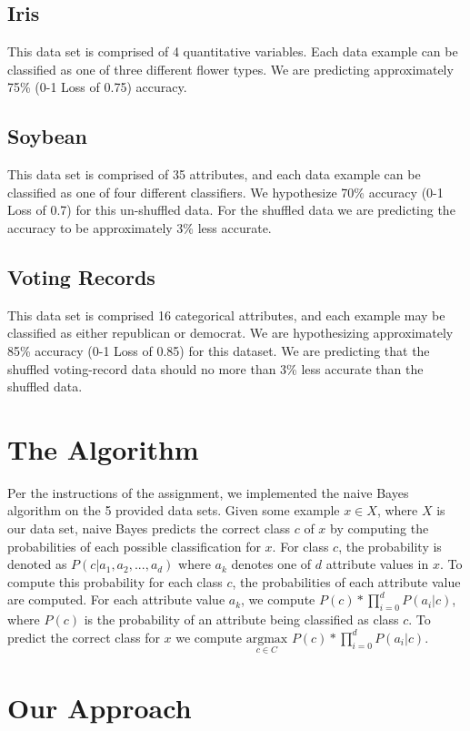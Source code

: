 \documentclass[twoside,11pt]{article}
\begin{document}
\subsection{Iris} This data set is comprised of 4 quantitative variables. Each data example can be classified as one of three different flower types. We are predicting approximately 75\% (0-1 Loss of 0.75) accuracy.
\subsection{Soybean} This data set is comprised of 35 attributes, and each data example can be classified as one of four different classifiers. We hypothesize 70\% accuracy (0-1 Loss of 0.7) for this un-shuffled data. For the shuffled data we are predicting the accuracy to be approximately 3\% less accurate.
\subsection{Voting Records} This data set is comprised 16 categorical attributes, and each example may be classified as either republican or democrat. We are hypothesizing approximately 85\% accuracy (0-1 Loss of 0.85) for this dataset. We are predicting that the shuffled voting-record data should no more than 3\% less accurate than the shuffled data.\\

\section{The Algorithm}
Per the instructions of the assignment, we implemented the naive Bayes algorithm on the 5 provided data sets. Given some example $x \in X$, where $X$ is our data set, naive Bayes predicts the correct class $c$ of $x$ by computing the probabilities of each possible classification for $x$. For class $c$, the probability is denoted as $P(c | a_1, a_2,...,a_d)$ where $a_k$ denotes one of $d$ attribute values in $x$. To compute this probability for each class $c$, the probabilities of each attribute value are computed. For each attribute value $a_k$, we compute $P(c) * \prod^d_{i=0} P(a_i | c)$, where $P(c)$ is the probability of an attribute being classified as class $c$. To predict the correct class for $x$ we compute $\underset{c \in C}{\mathrm{argmax}}$ $P(c) * \prod^d_{i=0} P(a_i | c)$.

\section{Our Approach}
\end{document}
